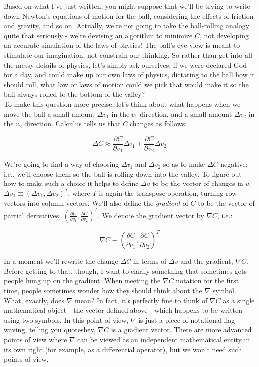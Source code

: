 Based on what I've just written, you might suppose that we'll be trying to write down Newton's equations of motion for the ball, considering the effects of friction and gravity, and so on. Actually, we're not going to take the ball-rolling analogy quite that seriously - we're devising an algorithm to minimize $C$, not developing an accurate simulation of the laws of physics! The ball's-eye view is meant to stimulate our imagination, not constrain our thinking. So rather than get into all the messy details of physics, let's simply ask ourselves: if we were declared God for a day, and could make up our own laws of physics, dictating to the ball how it should roll, what law or laws of motion could we pick that would make it so the ball always rolled to the bottom of the valley?\\

To make this question more precise, let's think about what happens when we move the ball a small amount $\Delta v_1$ in the $v_1$ direction, and a small amount $\Delta v_2$ in the $v_2$ direction. Calculus tells us that $C$ changes as follows:

\begin{equation}
\Delta C\approx\frac{\partial C}{\partial v_1}\Delta v_1 +\frac{\partial C}{\partial v_2}\Delta v_2
\label{eq: changes on C}
\end{equation}

We're going to find a way of choosing $\Delta v_1$ and $\Delta v_2$ so as to make $\Delta C$ negative; i.e., we'll choose them so the ball is rolling down into the valley. To figure out how to make such a choice it helps to define $\Delta v$ to be the vector of changes in $v$, $\Delta v_1\equiv \left(\Delta v_1,\Delta v_2\right)^T$, where $T$ is again the transpose operation, turning row vectors into column vectors. We'll also define the \textit{gradient} of $C$ to be the vector of partial derivatives, $\left(\frac{\partial C}{\partial v_1}, \frac{\partial C}{\partial v_2}\right)^T$. We denote the gradient vector by $\nabla C$, i.e.:

\begin{equation}
\nabla C\equiv \left(\frac{\partial C}{\partial v_1}, \frac{\partial C}{\partial v_2}\right)^T
\label{eq: gradient of C}
\end{equation}

In a moment we'll rewrite the change $\Delta C$ in terms of $\Delta v$ and the gradient, $\nabla C$. Before getting to that, though, I want to clarify something that sometimes gets people hung up on the gradient. When meeting the $\nabla C$ notation for the first time, people sometimes wonder how they should think about the $\nabla$ symbol. What, exactly, does $\nabla$ mean? In fact, it's perfectly fine to think of $\nabla C$ as a single mathematical object - the vector defined above - which happens to be written using two symbols. In this point of view, $\nabla$ is just a piece of notational flag-waving, telling you quotes{hey, $\nabla C$ is a gradient vector}. There are more advanced points of view where $\nabla$ can be viewed as an independent mathematical entity in its own right (for example, as a differential operator), but we won't need such points of view.\\

